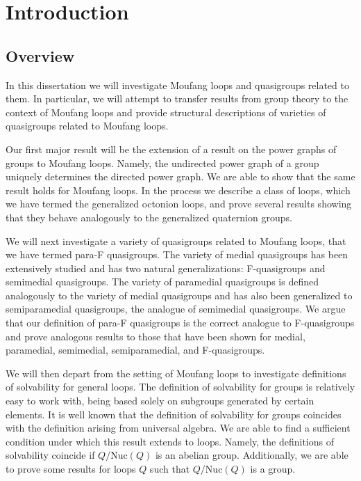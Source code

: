 \documentclass[12pt]{report}
\theoremstyle{definition}
\newcommand{\nuc}{\text{Nuc}}       %
\begin{document}
\newpage %


\chapter{Introduction}

\section{Overview}

In this dissertation we will investigate Moufang loops and quasigroups related to them. In particular, we will attempt
  to transfer results from group theory to the context of Moufang loops and provide structural descriptions of
  varieties of quasigroups related to Moufang loops.

Our first major result will be the extension of a result on the power graphs of groups to Moufang loops. Namely, the
  undirected power graph of a group uniquely determines the directed power graph. We are able to show that the same
  result holds for Moufang loops. In the process we describe a class of loops, which we have termed the generalized
  octonion loops, and prove several results showing that they behave analogously to the generalized quaternion groups.

We will next investigate a variety of quasigroups related to Moufang loops, that we have termed para-F quasigroups. The
  variety of medial quasigroups has been extensively studied and has two natural generalizations: F-quasigroups and
  semimedial quasigroups. The variety of paramedial quasigroups is defined analogously to the variety of medial
  quasigroups and has also been generalized to semiparamedial quasigroups, the analogue of semimedial quasigroups. We
  argue that our definition of para-F quasigroups is the correct analogue to F-quasigroups and prove analogous results
  to those that have been shown for medial, paramedial, semimedial, semiparamedial, and F-quasigroups.

We will then depart from the setting of Moufang loops to investigate definitions of solvability for general loops. The
  definition of solvability for groups is relatively easy to work with, being based solely on subgroups generated by
  certain elements. It is well known that the definition of solvability for groups coincides with the definition arising
  from universal algebra. We are able to find a sufficient condition under which this result extends to loops. Namely,
  the definitions of solvability coincide if $Q/\nuc(Q)$ is an abelian group. Additionally, we are able to prove some
  results for loops $Q$ such that $Q/\nuc(Q)$ is a group.
\end{document}
